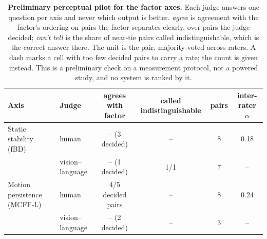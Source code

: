 \begin{table}[tb]
\centering
\small
\setlength{\tabcolsep}{6pt}
\begin{tabular}{l l c c c c}
\toprule
Axis & Judge & agrees with factor & called indistinguishable & pairs & inter-rater $\alpha$ \\
\midrule
Static stability (fBD) & human & -- (3 decided) & -- & 8 & 0.18 \\
 & vision--language & -- (1 decided) & 1/1 & 7 & -- \\
Motion persistence (MCFF-L) & human & 4/5 decided pairs & -- & 8 & 0.24 \\
 & vision--language & -- (2 decided) & -- & 3 & -- \\
\bottomrule
\end{tabular}
\caption{\textbf{Preliminary perceptual pilot for the factor axes.} Each judge answers one question per axis and never which output is better. \emph{agree} is agreement with the factor's ordering on pairs the factor separates clearly, over pairs the judge decided; \emph{can't tell} is the share of near-tie pairs called indistinguishable, which is the correct answer there. The unit is the pair, majority-voted across raters. A dash marks a cell with too few decided pairs to carry a rate; the count is given instead. This is a preliminary check on a measurement protocol, not a powered study, and no system is ranked by it.}
\label{tab:perception}
\end{table}